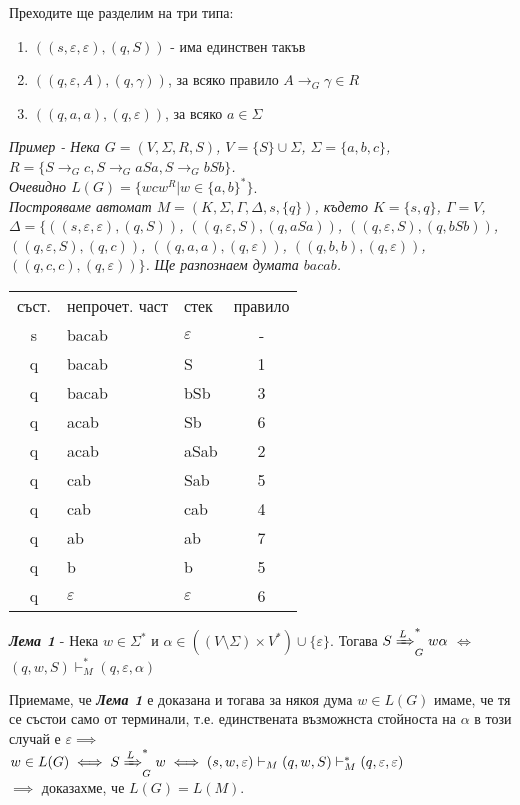\documentclass[fleqn,12pt]{article}
\begin{document}
\begin{flushleft}
Преходите ще разделим на три типа:
\begin{enumerate}
    \item $((s, \varepsilon, \varepsilon), (q, S))$ - има единствен такъв
    \item \label{transition_type:two} $((q, \varepsilon, A), (q, \gamma))$, за всяко правило $ A \to_G \gamma \in R$
    \item $((q, a, a), (q, \varepsilon))$, за всяко $a \in \Sigma$
\end{enumerate}

\textit{Пример - Нека $G = (V, \Sigma, R, S)$, $V = \{S\} \cup \Sigma$, $\Sigma = \{a, b, c\}$, $R = \{S \to_G c, S \to_G aSa, S \to_G bSb\}$.} \\
\textit{Очевидно $L(G) = \{wcw^R | w \in \{a, b\}^*\}$}. \\
\textit{Построяваме автомат $M = (K, \Sigma, \Gamma, \Delta, s, \{q\})$, където $K = \{s, q\}$, $\Gamma = V$, $\Delta = \{$$((s, \varepsilon, \varepsilon), (q, S))$, $((q, \varepsilon, S), (q, aSa))$, $((q, \varepsilon, S), (q, bSb))$, $((q, \varepsilon, S), (q, c))$, $((q, a, a), (q, \varepsilon))$, $((q, b, b), (q, \varepsilon))$, $((q, c, c), (q, \varepsilon))$$\}$.}
\textit{Ще разпознаем думата $bacab$.}

\begin{tabular}{ |c|l|l|c| } 
\hline
съст. & непрочет. част & стек & правило \\ 
s & bacab & $\varepsilon$ & - \\
q & bacab & S & 1 \\
q & bacab & bSb & 3 \\
q & acab & Sb & 6 \\
q & acab & aSab & 2 \\
q & cab & Sab & 5 \\
q & cab & cab & 4 \\
q & ab & ab & 7 \\
q & b & b & 5 \\
q & $\varepsilon$ & $\varepsilon$ & 6 \\
\hline
\end{tabular}

\textit{\textbf{Лема 1}} - Нека $w \in \Sigma^*$ и $\alpha \in ((V \setminus \Sigma) \times V^*) \cup \{\varepsilon\}$.
Тогава $S \xRightarrow[]{L}_G^* w\alpha$ $\iff$ $(q, w, S) \vdash_M^* (q, \varepsilon, \alpha)$

Приемаме, че \textit{\textbf{Лема 1}} е доказана и тогава за някоя дума $w \in L(G)$ имаме, че тя се състои само от терминали, т.е. единствената възможнста стойноста на $\alpha$ в този случай е $\varepsilon \implies$ \\
$w \in L(G) \iff S \xRightarrow[]{L}_G^* w \iff (s, w, \varepsilon) \vdash_M (q, w, S) \vdash_M^* (q, \varepsilon, \varepsilon)$ \\
$\implies$ доказахме, че $L(G) = L(M)$.


\end{flushleft}
\end{document}
